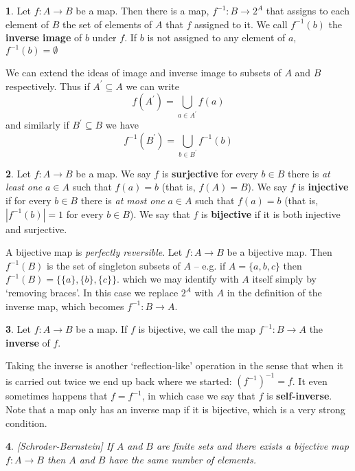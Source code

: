 \documentclass[oneside,english]{amsbook}
\numberwithin{section}{chapter}
\theoremstyle{plain}
\newtheorem{thm}{\protect\theoremname}
\theoremstyle{definition}
\newtheorem{defn}[thm]{\protect\definitionname}
\providecommand{\definitionname}{Definition}
\providecommand{\theoremname}{Theorem}
\begin{document}
\begin{defn} 
	Let $f:A\to B$ be a map. Then there is a map, $f^{-1}:B\to2^{A}$ that assigns to each element of $B$ the set of elements of $A$ that $f$ assigned to it. We call $f^{-1}(b)$ the \textbf{inverse image} of $b$ under $f$. If $b$ is not assigned to any element of $a$, $f^{-1}(b)=\emptyset$ 
\end{defn} 
We can extend the ideas of image and inverse image to subsets of $A$ and $B$ respectively. Thus if $A^{\prime}\subseteq A$ we can write 
	\[ f(A^{\prime})=\bigcup_{a\in A^{\prime}}f(a) \]
and similarly if $B^{\prime}\subseteq B$ we have
	\[ f^{-1}(B^{\prime})=\bigcup_{b\in B^{\prime}}f^{-1}(b) \]

\begin{defn} 
	Let $f:A\to B$ be a map. We say $f$ is \textbf{surjective }for every $b\in B$ there is \emph{at least one} $a\in A$ such that $f(a)=b$ (that is, $f(A)=B$). We say $f$ is \textbf{injective} if for every $b\in B$ there is \emph{at most one} $a\in A$ such that $f(a)=b$ (that is, $|f^{-1}(b)|=1$ for every $b\in B$). We say that $f$ is \textbf{bijective} if it is both injective and surjective. 
\end{defn}
 
A bijective map is \emph{perfectly reversible}. Let $f:A\to B$ be a bijective map. Then $f^{-1}(B)$ is the set of singleton subsets of $A$ -- e.g. if $A=\{a,b,c\}$ then $f^{-1}(B)=\{\{a\},\{b\},\{c\}\}$. which we may identify with $A$ itself simply by `removing braces'. In this case we replace $2^{A}$ with $A$ in the definition of the inverse map, which becomes $f^{-1}:B\to A$.  

\begin{defn} 
	Let $f:A\to B$ be a map. If $f$ is bijective, we call the map $f^{-1}:B\to A$ the \textbf{inverse }of $f$. 
\end{defn} 

Taking the inverse is another `reflection-like' operation in the sense that when it is carried out twice we end up back where we started: $(f^{-1})^{-1}=f$. It even sometimes happens that $f=f^{-1}$, in which case we say that $f$ is \textbf{self-inverse}. Note that a map only has an inverse map if it is bijective, which is a very strong condition. 

\begin{thm} 
	{[}Schroder-Bernstein{]} If $A$ and $B$ are finite sets and there exists a bijective map $f:A\to B$ then $A$ and $B$ have the same number of elements.
\end{thm} 
\end{document}
